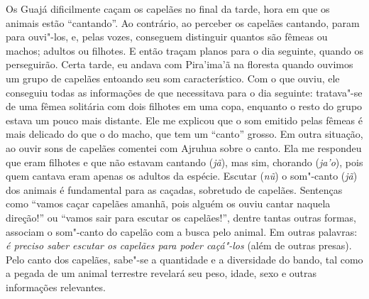 Os Guajá dificilmente caçam os capelães no final da tarde, hora em que
os animais estão ``cantando''. Ao contrário, ao perceber os capelães
cantando, param para ouvi"-los, e, pelas vozes, conseguem distinguir
quantos são fêmeas ou machos; adultos ou filhotes. E então traçam planos
para o dia seguinte, quando os perseguirão. Certa tarde, eu andava com
Pira'ima'ã na floresta quando ouvimos um grupo de capelães entoando seu
som característico. Com o que ouviu, ele conseguiu todas as informações
de que necessitava para o dia seguinte: tratava"-se de uma fêmea
solitária com dois filhotes em uma copa, enquanto o resto do grupo
estava um pouco mais distante. Ele me explicou que o som emitido pelas
fêmeas é mais delicado do que o do macho, que tem um ``canto'' grosso. Em
outra situação, ao ouvir sons de capelães comentei com Ajruhua sobre o
canto. Ela me respondeu que eram filhotes e que não estavam cantando
(\emph{jã}), mas sim, chorando (\emph{ja'o}), pois quem cantava eram
apenas os adultos da espécie. Escutar (\emph{nũ}) o som"-canto
(\emph{jã}) dos animais é fundamental para as caçadas, sobretudo de
capelães. Sentenças como ``vamos caçar capelães amanhã, pois alguém os
ouviu cantar naquela direção!'' ou ``vamos sair para escutar os
capelães!'', dentre tantas outras formas, associam o som"-canto do capelão
com a busca pelo animal. Em outras palavras: \emph{é preciso saber
escutar os capelães para poder caçá"-los} (além de outras presas). Pelo
canto dos capelães, sabe"-se a quantidade e a diversidade do bando, tal
como a pegada de um animal terrestre revelará seu peso, idade, sexo e
outras informações relevantes.

